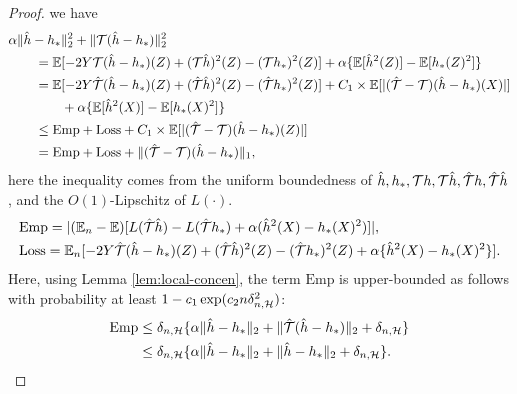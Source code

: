 \begin{proof}
we have 
\begin{align}\label{eq:single-quadratic}
    & \alpha \|\hat{h}- h_* \|^2_2 + \|{\mathcal{T}}(\hat{h}-h_*)\|^2_2  \nonumber\\ 
    &\qquad= \mathbb{E}[ - 2 Y  {\mathcal{T}} (\hat{h}-h_*)(Z)  + ({\mathcal{T}} \hat{h})^2(Z) -  ({\mathcal{T}} h_*)^2(Z) ] +  \alpha\{\mathbb{E}[\hat{h}^2(Z)] - \mathbb{E}[h_*(Z)^2]\}\nonumber\\
    &\qquad= \mathbb{E}[ - 2 Y  \hat {{\mathcal{T}}} (\hat{h}-h_*)(Z) + (\hat {{\mathcal{T}}} \hat{h})^2(Z) - (\hat {{\mathcal{T}}} h_*)^2(Z) ]   +  C_1 \times \mathbb{E}[|(\hat {{\mathcal{T}}} - {\mathcal{T}}) (\hat{h}-h_*)(X)|] \nonumber\\ 
    &\qquad\qquad+  \alpha\{\mathbb{E}[\hat{h}^2(X)] - \mathbb{E}[h_*(X)^2]\} \nonumber\\
    &\qquad\leq \mathrm{Emp} + \mathrm{Loss} + C_1 \times \mathbb{E}[|(\hat {{\mathcal{T}}} - {\mathcal{T}}) (\hat{h}-h_*)(Z)|]  \nonumber\\ 
    &\qquad= \mathrm{Emp} + \mathrm{Loss} + \|(\hat {{\mathcal{T}}}-{\mathcal{T}}) (  \hat{h}- h_*)\|_1,
\end{align}
here the inequality comes from the uniform boundedness of $\hat{h}, h_*, {\mathcal{T}}{h}, {\mathcal{T}}{\hat{h}},\hat{{\mathcal{T}}}h,\hat{{\mathcal{T}}}\hat{h} $,  and the $O(1)$-Lipschitz of $L(\cdot)$.
\begin{align*}
    &\mathrm{Emp} = |(\mathbb{E}_n-\mathbb{E})  [L(\hat {{\mathcal{T}}} \hat{h})- L(\hat {{\mathcal{T}}} h_*)+\alpha(\hat{h}^2(X)-h_*(X)^2)]|,  \\ 
    & \mathrm{Loss} =  \mathbb{E}_n[ -2Y  \hat {{\mathcal{T}}} (\hat{h}-h_*)(Z)  + (\hat {{\mathcal{T}}} \hat{h})^2(Z) - (\hat {{\mathcal{T}}} h_*)^2(Z) + \alpha\{\hat{h}^2(X)- h_*(X)^2 \}]. 
\end{align*} 
Here, using Lemma \ref{lem:local-concen}, the term $\mathrm{Emp} $ is upper-bounded as follows with probability at least $1 - c_1\exp(c_2 n\delta_{n,\mathcal{H}}^2)$: 
\begin{align}\label{eq:single-emp}    
  \mathrm{Emp}  &\leq \delta_{n,\mathcal{H}}\{ \alpha \|\hat{h}-h_*\|_2+ \|\hat {{\mathcal{T}}}(\hat{h}-h_*)\|_2+   \delta_{n,\mathcal{H}}   \} \nonumber\\ 
&\leq \delta_{n,\mathcal{H}}\{ \alpha \|\hat{h}-h_*\|_2 +  \|\hat{h}-h_*\|_2 +   \delta_{n,\mathcal{H}}   \}. 
\end{align} 


\end{proof}

